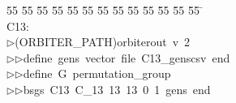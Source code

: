 %
%
\begin{tabbing}
55 \= 55 \= 55 \= 55 \= 55 \= 55 \= 55 \= 55 \= 55 \= 55 \= 55 \= 55 \= 55 \= \kill
\\[0pt]
C13:\\[0pt]
$\triangleright$\>(ORBITER\_PATH)orbiterout\ v\ 2\ \\[0pt]
$\triangleright$\>$\triangleright$\>define\ gens\ vector\ file\ C13\_genscsv\ end\ \\[0pt]
$\triangleright$\>$\triangleright$\>define\ G\ permutation\_group\ \\[0pt]
$\triangleright$\>$\triangleright$\>bsgs\ C13\ C\_13\ 13\ 13\ 0\ 1\ gens\ end\ \\[0pt]
\end{tabbing}

